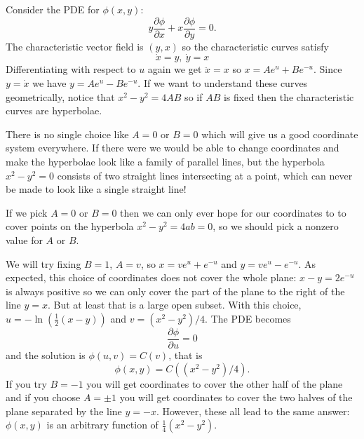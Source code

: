 \begin{exm}
Consider the PDE for $\phi(x,y)$:
\[y\frac{\partial\phi}{\partial x}+x\frac{\partial\phi}{\partial y}=0.\]
The characteristic vector field is $(y,x)$ so the characteristic curves satisfy
\[\dot{x}=y,\ \dot{y}=x\]
Differentiating with respect to $u$ again we get $\ddot{x}=x$ so $x=Ae^u+Be^{-u}$. Since $y=\dot{x}$ we have $y=Ae^u-Be^{-u}$. If we want to understand these curves geometrically, notice that $x^2-y^2=4AB$ so if $AB$ is fixed then the characteristic curves are hyperbolae.

There is no single choice like $A=0$ or $B=0$ which will give us a good coordinate system everywhere. If there were we would be able to change coordinates and make the hyperbolae look like a family of parallel lines, but the hyperbola $x^2-y^2=0$ consists of two straight lines intersecting at a point, which can never be made to look like a single straight line!

If we pick $A=0$ or $B=0$ then we can only ever hope for our coordinates to to cover points on the hyperbola $x^2-y^2=4ab=0$, so we should pick a nonzero value for $A$ or $B$.

We will try fixing $B=1$, $A=v$, so $x=ve^u+e^{-u}$ and $y=ve^u-e^{-u}$. As expected, this choice of coordinates does not cover the whole plane: $x-y=2e^{-u}$ is always positive so we can only cover the part of the plane to the right of the line $y=x$. But at least that is a large open subset. With this choice, $u=-\ln\left(\tfrac{1}{2}(x-y)\right)$ and $v=(x^2-y^2)/4$. The PDE becomes
\[\frac{\partial\phi}{\partial u}=0\]
and the solution is $\phi(u,v)=C(v)$, that is
\[\phi(x,y)=C((x^2-y^2)/4).\]
If you try $B=-1$ you will get coordinates to cover the other half of the plane and if you choose $A=\pm 1$ you will get coordinates to cover the two halves of the plane separated by the line $y=-x$. However, these all lead to the same answer: $\phi(x,y)$ is an arbitrary function of $\tfrac{1}{4}(x^2-y^2)$.
\end{exm}

